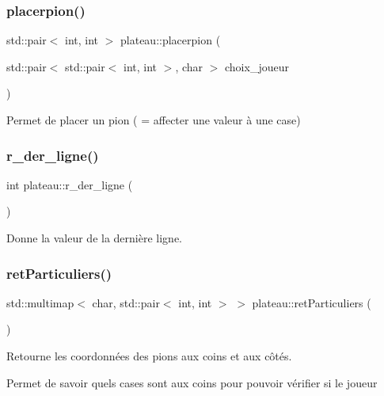 \subsubsection{\texorpdfstring{placerpion()}{placerpion()}}
{\footnotesize\ttfamily std\+::pair$<$ int, int $>$ plateau\+::placerpion (\begin{DoxyParamCaption}\item[{std\+::pair$<$ std\+::pair$<$ int, int $>$, char $>$}]{choix\+\_\+joueur }\end{DoxyParamCaption})}



Permet de placer un pion ( = affecter une valeur à une case) 

\mbox{\label{classplateau_a7dc94d2ffd474bd7871deb25d9af8091}} 
\subsubsection{\texorpdfstring{r\+\_\+der\+\_\+ligne()}{r\_der\_ligne()}}
{\footnotesize\ttfamily int plateau\+::r\+\_\+der\+\_\+ligne (\begin{DoxyParamCaption}{ }\end{DoxyParamCaption})\hspace{0.3cm}{\ttfamily [inline]}}



Donne la valeur de la dernière ligne. 

\mbox{\label{classplateau_a1ab855651bf0107e7af3867873d54389}} 
\subsubsection{\texorpdfstring{ret\+Particuliers()}{retParticuliers()}}
{\footnotesize\ttfamily std\+::multimap$<$ char, std\+::pair$<$ int, int $>$ $>$ plateau\+::ret\+Particuliers (\begin{DoxyParamCaption}{ }\end{DoxyParamCaption})}



Retourne les coordonnées des pions aux coins et aux côtés. 

Permet de savoir quels cases sont aux coins pour pouvoir vérifier si le joueur \mbox{\label{classplateau_ae9917aadf7efa09d855f98477da9e6f2}} 
